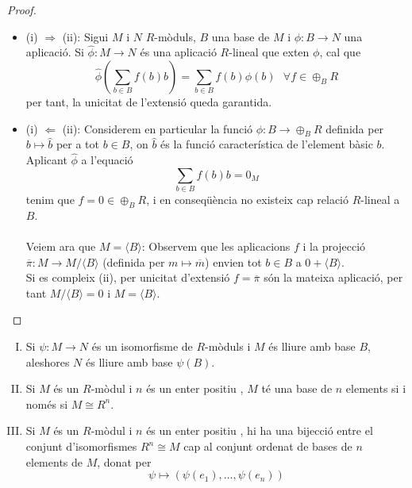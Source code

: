 \begin{proof}
\begin{itemize}
\item (i) $\Rightarrow$ (ii): Sigui $M$ i $N$ $R$-mòduls, $B$ una base de $M$ i $\phi : B\rightarrow N$ una aplicació. Si $\hat{\phi}:M\rightarrow N$ és una aplicació $R$-lineal que exten $\phi$, cal que 
\begin{equation} \label{formula1}
\hat{\phi} \left( \sum_{b\in B}f(b)b \right)=\sum_{b\in B}f(b)\phi(b) \ \ \ \forall f\in  \oplus_BR
\end{equation}
per tant, la unicitat de l'extensió queda garantida.
\item (i) $\Leftarrow$ (ii): Considerem en particular la funció $\phi: B\rightarrow \oplus_BR$ definida per $b \mapsto \hat{b}$ per a tot $b\in B$, on $\hat{b}$ és la funció característica de l'element bàsic $b$. \\
Aplicant $\hat{\phi}$ a l'equació 
$$
\sum_{b\in B}f(b)b=0_M
$$
tenim que $f=0\in \oplus_BR$, i en conseqüència no existeix cap relació $R$-lineal a $B$. 
\\
\\
Veiem ara que $M=\langle B\rangle$: Observem que les aplicacions $f$ i la projecció $\overline{\pi}: M \rightarrow M/\langle B \rangle $ (definida per $m \mapsto \overline{m}$) envien tot $b\in B$ a $0+\langle B \rangle$. \\
Si es compleix (ii), per unicitat d'extensió $f=\overline{\pi}$ són la mateixa aplicació, per tant $M/\langle B \rangle = 0$ i $M=\langle B \rangle $.
\end{itemize}
\end{proof}

\begin{corollary}  \label{corol1}
\begin{enumerate}[(I)]
\item Si $\psi:M \rightarrow N$ és un isomorfisme de $R$-mòduls i $M$ és lliure amb base $B$, aleshores $N$ és lliure amb base $\psi(B)$.
\item  Si $M$ és un $R$-mòdul i $n$ és un enter positiu , $M$ té una base de $n$ elements si i només si $M\cong R^n$.
\item Si $M$ és un $R$-mòdul i $n$ és un enter positiu , hi ha una bijecció entre el conjunt d'isomorfismes $R^n\cong M$ cap al conjunt ordenat de bases de $n$ elements de $M$, donat per 
$$
\psi \mapsto (\psi(e_1),\dots , \psi(e_n))
$$
\end{enumerate}
\end{corollary}

